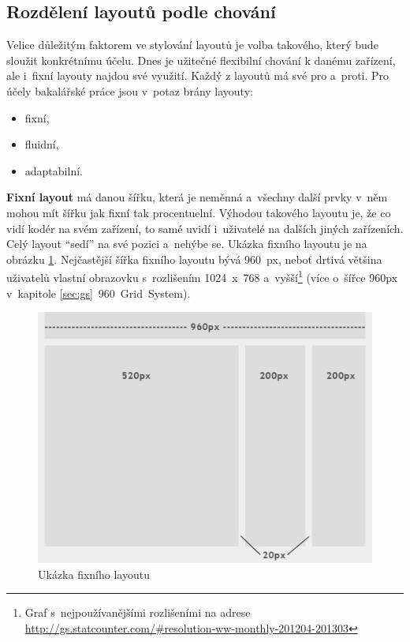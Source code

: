 \documentclass[thesis=B,czech]{FITthesis}[2012/06/26]
\begin{document}
\subsection{Rozdělení layoutů podle chování}

Velice důležitým faktorem ve stylování layoutů je volba takového, který bude sloužit konkrétnímu účelu. Dnes je užitečné flexibilní chování k danému zařízení, ale i~fixní layouty najdou své využití. Každý z layoutů má své pro a~proti. Pro účely bakalářské práce jsou v~potaz brány layouty:

\begin{itemize}
 \item fixní,
 \item fluidní,
 \item adaptabilní.
\end{itemize}
\textbf{Fixní layout} má danou šířku, která je neměnná a~všechny další prvky v~něm mohou mít šířku jak fixní tak procentuelní. Výhodou takového layoutu je, že co vidí kodér na svém zařízení, to samé uvidí i~uživatelé na dalších jiných zařízeních\cite{fix}. Celý layout “sedí” na své pozici a~nehýbe se. Ukázka fixního layoutu je na obrázku \ref{imgFix}. Nejčastější šířka fixního layoutu bývá 960~px, neboť drtivá většina uživatelů vlastní obrazovku s~rozlišením 1024~x~768 a~vyšší\footnote{Graf s~nejpoužívanějšími rozlišeními na adrese  \url{http://gs.statcounter.com/\#resolution-ww-monthly-201204-201303}} (více o~šířce 960px v~kapitole \ref{sec:gs}~960~Grid~System). 

\begin{figure}[h]
	\begin{center}
	\includegraphics[scale=0.5]{images/image06.png}
	\end{center}
	\caption{Ukázka fixního layoutu\cite{fix}}
	\label{imgFix}
\end{figure}
\end{document}
